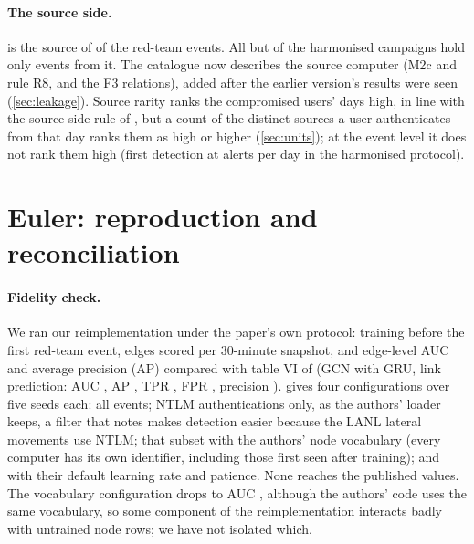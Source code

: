\documentclass[11pt,a4paper]{article}
\begin{document}
\paragraph{The source side.} \TopHost{} is the source of \RedTeamTopHostShare{} of the red-team events. All but \HarmCampaignsOffTopHost{} of the \HarmTestCampaigns{} harmonised campaigns hold only events from it. The catalogue now describes the source computer (M2c and rule R8, and the F3 relations), added after the earlier version's results were seen (\cref{sec:leakage}). Source rarity ranks the compromised users' days high, in line with the source-side rule of \textcite{garchery2020adsage}, but a count of the distinct sources a user authenticates from that day ranks them as high or higher (\cref{sec:units}); at the event level it does not rank them high (first detection at \HarmSourceRarityFirstDetection{} alerts per day in the harmonised protocol).

\section{Euler: reproduction and reconciliation}
\label{sec:euler}

\paragraph{Fidelity check.} We ran our reimplementation under the paper's own protocol: training before the first red-team event, edges scored per 30-minute snapshot, and edge-level AUC and average precision (AP) compared with table VI of \textcite{king2022euler} (GCN with GRU, link prediction: AUC \EulerPublishedAuc{}, AP \EulerPublishedAp{}, TPR \EulerPublishedTpr{}, FPR \EulerPublishedFpr{}, precision \EulerPublishedPrecision{}).  gives four configurations over five seeds each: all events; NTLM authentications only, as the authors' loader keeps, a filter that \textcite{larroche2026fair} notes makes detection easier because the LANL lateral movements use NTLM; that subset with the authors' node vocabulary (every computer has its own identifier, including those first seen after training); and with their default learning rate and patience. None reaches the published values. The vocabulary configuration drops to AUC \EulerFidNtlmVocabularyAuc{}, although the authors' code uses the same vocabulary, so some component of the reimplementation interacts badly with untrained node rows; we have not isolated which.
\end{document}
